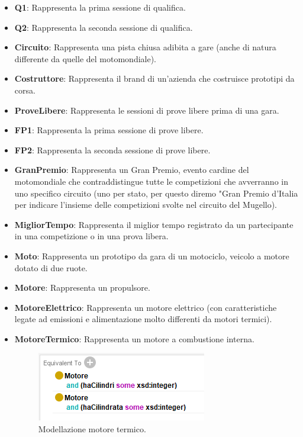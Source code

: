 \begin{itemize}
  \item \textbf{Q1}: Rappresenta la prima sessione di qualifica.
  \item \textbf{Q2}: Rappresenta la seconda sessione di qualifica.
  \item \textbf{Circuito}: Rappresenta una pista chiusa adibita a gare (anche di natura differente da quelle del motomondiale).
  \item \textbf{Costruttore}: Rappresenta il brand di un'azienda che costruisce prototipi da corsa.
  \item \textbf{ProveLibere}: Rappresenta le sessioni di prove libere prima di una gara.
  \item \textbf{FP1}: Rappresenta la prima sessione di prove libere.
  \item \textbf{FP2}: Rappresenta la seconda sessione di prove libere.
  \item \textbf{GranPremio}: Rappresenta un Gran Premio, evento cardine del motomondiale che contraddistingue tutte le competizioni che avverranno in uno specifico circuito (uno per stato, per questo diremo "Gran Premio d'Italia per indicare l'insieme delle competizioni svolte nel circuito del Mugello).
  \item \textbf{MigliorTempo}: Rappresenta il miglior tempo registrato da un partecipante in una competizione o in una prova libera.
  \item \textbf{Moto}: Rappresenta un prototipo da gara di un motociclo, veicolo a motore dotato di due ruote.
  \item \textbf{Motore}: Rappresenta un propulsore.
  \item \textbf{MotoreElettrico}: Rappresenta un motore elettrico (con caratteristiche legate ad emissioni e alimentazione molto differenti da motori termici).
  \item \textbf{MotoreTermico}: Rappresenta un motore a combustione interna.
   \begin{figure}[H]
    \begin{center}
        \includegraphics[scale=1]{img/spec_motoretermico.png}
       \caption{Modellazione motore termico.} 
    \end{center}
\end{figure}

\end{itemize}
